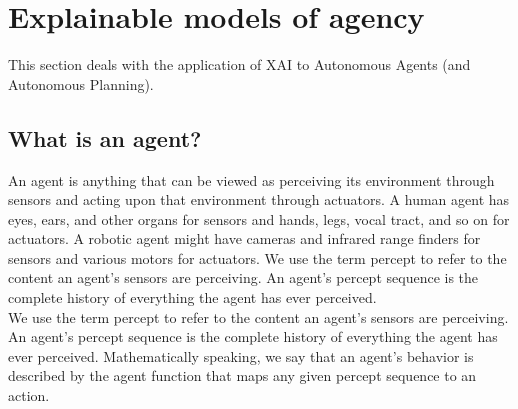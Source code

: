 \section{Explainable models of agency}
This section deals with the application of XAI to Autonomous Agents (and Autonomous Planning).
\subsection{What is an agent?}
An agent is anything that can be viewed as perceiving its environment through sensors and
acting upon that environment through actuators. A human agent has eyes, ears, and other organs for sensors and hands, legs, vocal tract,
and so on for actuators. A robotic agent might have cameras and infrared range finders for
sensors and various motors for actuators.
We use the term percept to refer to the content an agent's sensors are perceiving. An
agent's percept sequence is the complete history of everything the agent has ever perceived.\\

We use the term percept to refer to the content an agent's sensors are perceiving. An
agent's percept sequence is the complete history of everything the agent has ever perceived.
Mathematically speaking, we say that an agent's behavior is described by the agent function that maps any given
percept sequence to an action.

